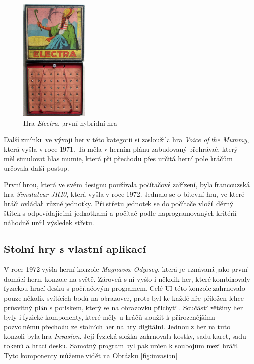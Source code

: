 \begin{figure}[H]
    \centering
    \includegraphics[width=0.3\textwidth]{resources/figures/electra.jpg}
    \caption{Hra \textit{Electra}, první hybridní hra \cite{history_of_hybrid_games}}
    \label{fig:electra}
\end{figure}

Další zmínku ve vývoji her v této kategorii si zasloužila hra \textit{Voice of the Mummy}, která vyšla v roce 1971. Ta měla v herním plánu zabudovaný přehrávač, který měl simulovat hlas mumie, která při přechodu přes určitá herní pole hráčům určovala další postup. \cite{voice_of_the_mummy}

První hrou, která ve svém designu používala počítačové zařízení, byla francouzská hra \textit{Simulateur JR10}, která vyšla v roce 1972. Jednalo se o bitevní hru, ve které hráči ovládali různé jednotky. Při střetu jednotek se do počítače vložil děrný štítek s odpovídajícími jednotkami a počítač podle naprogramovaných kritérií náhodně určil výsledek střetu. \cite{simulateur_jr10}

\subsection{Stolní hry s vlastní aplikací}
V roce 1972 vyšla herní konzole \textit{Magnavox Odyssey}, která je uznávaná jako první domácí herní konzole na světě. Zároveň s ní vyšlo i několik her, které kombinovaly fyzickou hrací desku s počítačovým programem. Celé UI této konzole zahrnovalo pouze několik svítících bodů na obrazovce, proto byl ke každé hře přiložen lehce průsvitný plán s potiskem, který se na obrazovku přichytil. Součástí většiny her byly i fyzické komponenty, které měly u hráčů sloužit k přirozenějšímu pozvolnému přechodu ze stolních her na hry digitální. \cite{magnavox_odyssey} Jednou z her na tuto konzoli byla hra \textit{Invasion}. Její fyzická složka zahrnovala kostky, sadu karet, sadu tokenů a hrací desku. Samotný program byl pak určen k soubojům mezi hráči. Tyto komponenty můžeme vidět na Obrázku \ref{fig:invasion} \cite{invasion,invasion_gameplay}

